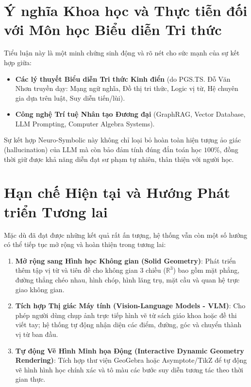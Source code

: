 \section{Ý nghĩa Khoa học và Thực tiễn đối với Môn học Biểu diễn Tri thức}
Tiểu luận này là một minh chứng sinh động và rõ nét cho sức mạnh của sự kết hợp giữa:
\begin{itemize}
    \item \textbf{Các lý thuyết Biểu diễn Tri thức Kinh điển} (do PGS.TS. Đỗ Văn Nhơn truyền dạy: Mạng ngữ nghĩa, Đồ thị tri thức, Logic vị từ, Hệ chuyên gia dựa trên luật, Suy diễn tiến/lùi).
    \item \textbf{Công nghệ Trí tuệ Nhân tạo Đương đại} (GraphRAG, Vector Database, LLM Prompting, Computer Algebra Systems).
\end{itemize}
Sự kết hợp Neuro-Symbolic này không chỉ loại bỏ hoàn toàn hiện tượng ảo giác (hallucination) của LLM mà còn bảo đảm tính đúng đắn toán học $100\%$, đồng thời giữ được khả năng diễn đạt sư phạm tự nhiên, thân thiện với người học.

\section{Hạn chế Hiện tại và Hướng Phát triển Tương lai}
Mặc dù đã đạt được những kết quả rất ấn tượng, hệ thống vẫn còn một số hướng có thể tiếp tục mở rộng và hoàn thiện trong tương lai:
\begin{enumerate}
    \item \textbf{Mở rộng sang Hình học Không gian (Solid Geometry)}: Phát triển thêm tập vị từ và tiên đề cho không gian 3 chiều ($\mathbb{R}^3$) bao gồm mặt phẳng, đường thẳng chéo nhau, hình chóp, hình lăng trụ, mặt cầu và quan hệ trực giao không gian.
    \item \textbf{Tích hợp Thị giác Máy tính (Vision-Language Models - VLM)}: Cho phép người dùng chụp ảnh trực tiếp hình vẽ từ sách giáo khoa hoặc đề thi viết tay; hệ thống tự động nhận diện các điểm, đường, góc và chuyển thành vị từ ban đầu.
    \item \textbf{Tự động Vẽ Hình Minh họa Động (Interactive Dynamic Geometry Rendering)}: Tích hợp thư viện GeoGebra hoặc Asymptote/TikZ để tự động vẽ hình hình học chính xác và tô màu các bước suy diễn tương tác theo thời gian thực.
\end{enumerate}
